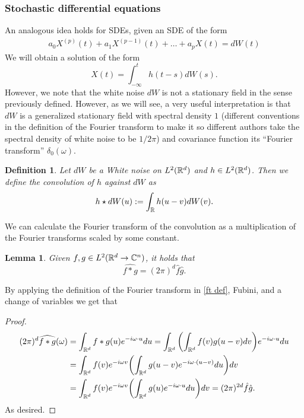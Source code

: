 \documentclass[12pt]{article}
\newtheorem{lemma}{Lemma}
\newtheorem{definition}{Definition}
\begin{document}
\subsubsection{Stochastic differential equations}
An analogous idea holds for SDEs, given an SDE of the form
\begin{align*}\label{diff equation}
    a_0X^{(p)}(t)+a_1X^{(p-1)}(t)+\ldots+a_pX(t)=dW(t)
\end{align*}
We will obtain a solution of the form
\begin{equation*}
    X(t)=\int_{-\infty}^t h(t-s)dW(s).
\end{equation*}
However, we note that the white noise $dW$ is not a stationary field in the sense previously defined. However, as we will see, a very useful interpretation is that $dW$ is a generalized stationary field with spectral density $1$ (different conventions in the definition of the Fourier transform to make it so different authors take the spectral density of white noise to be $1/2\pi$) and covariance function its ``Fourier transform'' $\delta_0(\omega)$.
\begin{definition}
    Let $dW$ be a White noise on $L^2({\mathbb R}^d)$ and $h\in L^2({\mathbb R}^d)$. Then we define the convolution of $h$ against $dW$ as $$h\star dW(u):=\int_{{\mathbb R}} h(u-v)dW(v).$$
\end{definition}
We can calculate the Fourier transform of the convolution as a multiplication of the Fourier transforms scaled by some constant.
\begin{lemma}
    Given $f,g\in L^2({\mathbb R}^d\to\mathbb{C}^n)$, it holds that
    \begin{equation*}
        \widehat{f*g}=(2\pi)^d\hat{f}\hat{g}.
    \end{equation*}
\end{lemma}
By applying the definition of the Fourier transform in \eqref{ft def}, Fubini, and a change of variables we get that
\begin{proof}
    \begin{align*}
       (2\pi)^d \widehat{f*g}(\omega)&=\int_{{\mathbb R}^d} f*g(u)e^{-i\omega\cdot u}du= \int_{{\mathbb R}^d} \qty(\int_{{\mathbb R}^d}f(v)g(u-v)dv)e^{-i \omega\cdot u}du \\
        &=\int_{{\mathbb R}^d} f(v)e^{-i\omega v}\qty(\int_{{\mathbb R}^d} g(u-v)e^{-i\omega\cdot (u-v)}du)dv\\
        &=\int_{{\mathbb R}^d} f(v)e^{-i\omega v}\qty(\int_{{\mathbb R}^d} g(u)e^{-i\omega\cdot u}du)dv
        = (2\pi)^{2d}\hat{f}\hat{g}.
    \end{align*}
    As desired.
\end{proof}
\end{document}

